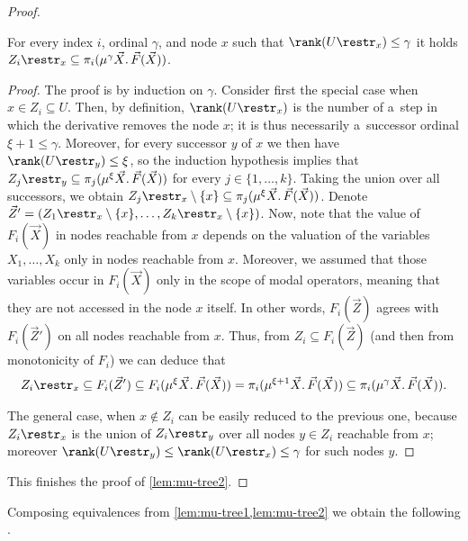 \documentclass{lmcs}
\numberwithin{equation}{section}
\numberwithin{figure}{section}
\begin{document}
\begin{proof}
	\begin{clm}
		For every index $i$, ordinal $\gamma$, and node $x$ such that $\rank(U\restr_x)\leq\gamma$ it holds $Z_i\restr_x\subseteq\pi_i(\mu^\gamma\vec{X}.\,\vec{F}(\vec{X}))$.
	\end{clm}

	\begin{proof}
		The proof is by induction on $\gamma$.
		Consider first the special case when $x\in Z_i\subseteq U$.
		Then, by definition, $\rank(U\restr_x)$ is the number of a~step in which the derivative removes the node $x$; it is thus necessarily a~successor ordinal $\xi+1\leq\gamma$.
		Moreover, for every successor $y$ of $x$ we then have $\rank(U\restr_y)\leq\xi$,
		so the induction hypothesis implies that $Z_j\restr_y\subseteq\pi_j(\mu^{\xi}\vec{X}.\,\vec{F}(\vec{X}))$ for every $j\in\{1,\dots,k\}$.
		Taking the union over all successors, we obtain $Z_j\restr_x\setminus\{x\}\subseteq\pi_j(\mu^{\xi}\vec{X}.\,\vec{F}(\vec{X}))$.
		Denote $\vec{Z}'=(Z_1\restr_x\setminus\{x\},\dots,Z_k\restr_x\setminus\{x\})$.
		Now, note that the value of $F_i(\vec{X})$ in nodes reachable from $x$ depends on the valuation of the variables $X_1,\dots,X_k$ only in nodes reachable from $x$.
		Moreover, we assumed that those variables occur in $F_i(\vec{X})$ only in the scope of modal operators, meaning that they are not accessed in the node $x$ itself.
		In other words, $F_i(\vec{Z})$ agrees with $F_i(\vec{Z}')$ on all nodes reachable from $x$.
		Thus, from $Z_i\subseteq F_i(\vec{Z})$ (and then from monotonicity of $F_i$) we can deduce that
		\begin{align*}
			Z_i\restr_x\subseteq F_i(\vec{Z}')\subseteq F_i(\mu^{\xi}\vec{X}.\,\vec{F}(\vec{X}))=\pi_i(\mu^{\xi+1}\vec{X}.\,\vec{F}(\vec{X}))\subseteq\pi_i(\mu^\gamma\vec{X}.\,\vec{F}(\vec{X})).
		\end{align*}
		
		The general case, when $x\not\in Z_i$ can be easily reduced to the previous one,
		because $Z_i\restr_x$ is the union of $Z_i\restr_y$ over all nodes $y\in Z_i$ reachable from $x$;
		moreover $\rank(U\restr_y)\leq\rank(U\restr_x)\leq\gamma$ for such nodes $y$.
	\end{proof}

	This finishes the proof of \cref{lem:mu-tree2}.
\end{proof}

Composing equivalences from \cref{lem:mu-tree1,lem:mu-tree2} we obtain the following .
\end{document}
